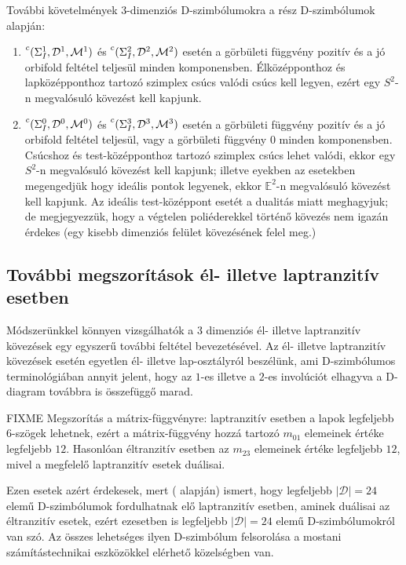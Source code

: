 \documentclass[12pt,magyar,a4paper]{article}
\newcommand{\leftexp}[2]{{\vphantom{#2}}^{#1}{#2}}
\begin{document}
További követelmények $3$-dimenziós D-szimbólumokra a rész D-szimbólumok alapján:
\begin{enumerate}                                                                                    
  \item $\leftexp{c}(\Sigma_I^1,\mathcal{D}^1,\mathcal{M}^1)$ és
    $\leftexp{c}(\Sigma_I^2,\mathcal{D}^2,\mathcal{M}^2)$ esetén a görbületi
    függvény pozitív és a jó orbifold feltétel teljesül minden komponensben.
    Élközépponthoz és lapközépponthoz tartozó szimplex csúcs valódi csúcs kell
    legyen, ezért egy $S^2$-n megvalósuló kövezést kell kapjunk.
  \item $\leftexp{c}(\Sigma_I^0,\mathcal{D}^0,\mathcal{M}^0)$ és
    $\leftexp{c}(\Sigma_I^3,\mathcal{D}^3,\mathcal{M}^3)$ esetén a görbületi függvény
    pozitív és a jó orbifold feltétel teljesül, vagy a görbületi függvény
    $0$ minden komponensben. Csúcshoz és test-középponthoz tartozó szimplex csúcs
    lehet valódi, ekkor egy $S^2$-n megvalósuló kövezést kell kapjunk; illetve
    eyekben az esetekben megengedjük hogy ideális pontok legyenek, ekkor
    $\mathbb{E}^2$-n megvalósuló kövezést kell kapjunk. Az ideális
    test-középpont esetét a dualitás miatt meghagyjuk; de megjegyezzük, hogy a
    végtelen poliéderekkel történő kövezés nem igazán érdekes (egy kisebb
    dimenziós felület kövezésének felel meg.)
\end{enumerate}

\subsection{További megszorítások él- illetve laptranzitív esetben}
Módszerünkkel könnyen vizsgálhatók a $3$ dimenziós él- illetve laptranzitív
kövezések egy egyszerű további feltétel bevezetésével. Az él- illetve
laptranzitív kövezések esetén egyetlen él- illetve lap-osztályról beszélünk, ami
D-szimbólumos terminológiában annyit jelent, hogy az $1$-es illetve a $2$-es
involúciót elhagyva a D-diagram továbbra is összefüggő marad.

FIXME Megszorítás a mátrix-függvényre: laptranzitív esetben a lapok legfeljebb
6-szögek lehetnek, ezért a mátrix-függvény hozzá tartozó $m_{01}$ elemeinek
értéke legfeljebb $12$. Hasonlóan éltranzitív esetben az $m_{23}$ elemeinek
értéke legfeljebb $12$, mivel a megfelelő laptranzitív esetek duálisai.

Ezen esetek azért érdekesek, mert (\cite{aa} alapján) ismert, hogy legfeljebb
$|\mathcal{D}|=24$ elemű D-szimbólumok fordulhatnak elő laptranzitív esetben,
aminek duálisai az éltranzitív esetek, ezért ezesetben is legfeljebb
$|\mathcal{D}|=24$ elemű D-szimbólumokról van szó. Az összes lehetséges ilyen
D-szimbólum felsorolása a mostani számítástechnikai eszközökkel elérhető
közelségben van.
\end{document}
